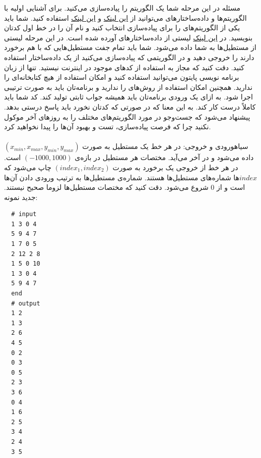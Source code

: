 ‌مسئله 
در این مرحله شما یک الگوریتم  را پیاده‌سازی می‌کنید. برای آشنایی اولیه با الگوریتم‌ها و داده‌ساختارهای  می‌توانید از 
\href{https://en.wikipedia.org/wiki/Space_partitioning}{این لینک}
 و 
 \href{http://cs.ucf.edu/~dcm/Teaching/COT4810-Spring2011/Presentations/JonLeonardSpacePartitioningDataStructures.pdf}{این لینک}
  استفاده کنید. شما باید یکی از الگوریتم‌های  را برای پیاده‌سازی انتخاب کنید و نام آن را در خط اول کدتان بنویسید. در 
  \href{https://en.wikipedia.org/wiki/List_of_data_structures}{این لینک}
   لیستی از داده‌ساختارهای  آورده شده است. در این مرحله لیستی از مستطیل‌ها به شما داده می‌شود. شما باید تمام جفت مستطیل‌هایی که با هم برخورد دارند را خروجی دهید و در الگوریتمی که پیاده‌سازی می‌کنید از یک داده‌ساختار  استفاده کنید. دقت کنید که مجاز به استفاده از کدهای موجود در اینترنت نیستید. تنها از زبان برنامه نویسی پایتون می‌توانید استفاده کنید و امکان استفاده از هیچ کتابخانه‌ای را ندارید. همچنین امکان استفاده از روش‌های  را ندارید و برنامه‌تان باید به صورت ترتیبی اجرا شود. به ازای یک ورودی برنامه‌تان باید  همیشه جواب ثابتی تولید کند. کد شما باید کاملاً درست کار کند. به این معنا که در صورتی که کدتان  نخورد باید پاسخ درستی بدهد. پیشنهاد می‌شود که جست‌و‌جو در مورد الگوریتم‌های مختلف  را به روزهای آخر موکول نکنید چرا که فرصت پیاده‌سازی، تست و بهبود آن‌ها را پیدا نخواهید کرد.
 \\
 \\
 ‌سیاه{ورودی و خروجی:}
در هر خط یک مستطیل به صورت $(x_{min}, x_{max}, y_{min}, y_{max})$ داده می‌شود و در آخر  می‌آید. مختصات هر مستطیل در بازه‌ی $(-1000, 1000)$ است. در هر خط از خروجی یک برخورد به صورت $(index_1, index_2)$ چاپ می‌شود که $index$ها شماره‌های مستطیل‌ها هستند. شماره‌ی مستطیل‌ها به ترتیب ورودی دادن آن‌ها است و از $0$ شروع می‌شود. دقت کنید که مختصات مستطیل‌ها لزوما صحیح نیستند.
 ‌جدید
  نمونه:
  
  \begin{latin}
  \begin{lstlisting}
  # input
  1 3 0 4
  5 9 4 7
  1 7 0 5
  2 12 2 8
  1 5 0 10
  1 3 0 4
  5 9 4 7
  end
  # output
  1 2
  1 3
  2 6
  4 5
  0 2
  0 3
  0 5
  2 3
  3 6
  0 4
  1 6
  2 5
  3 4
  2 4
  3 5
  \end{lstlisting}
  \end{latin}

